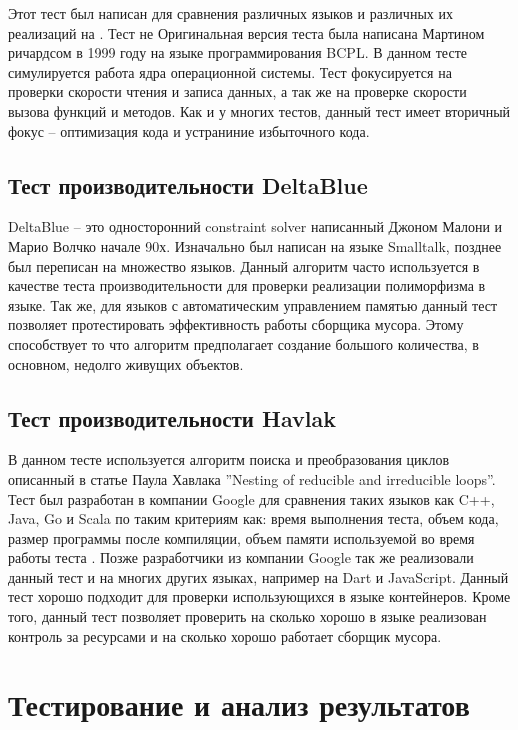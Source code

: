 Этот тест был написан для сравнения различных языков и различных их реализаций на . Тест не
Оригинальная версия теста была написана Мартином ричардсом в 1999 году на языке программирования BCPL. В данном тесте симулируется работа ядра операционной системы.
Тест фокусируется на проверки скорости чтения и записа данных, а так же на проверке скорости вызова функций и методов. Как и у многих тестов, данный тест имеет вторичный фокус -- оптимизация кода и устраниние избыточного кода.
\cite{Richards}

\subsection{Тест производительности DeltaBlue}

DeltaBlue -- это односторонний constraint solver написанный Джоном Малони и Марио Волчко начале 90х. Изначально был написан на языке Smalltalk, позднее был переписан на множество языков. Данный алгоритм часто используется в качестве теста производительности для проверки реализации полиморфизма в языке. Так же, для языков с автоматическим управлением памятью данный тест позволяет протестировать эффективность работы сборщика мусора. Этому способствует то что алгоритм предполагает создание большого количества, в основном, недолго живущих объектов.
\cite{DeltaBlueST, DeltaBlue, DeltaBlue2}

\subsection{Тест производительности Havlak}

В данном тесте используется алгоритм поиска и преобразования циклов описанный в статье Паула Хавлака ”Nesting of reducible and irreducible
loops”. \cite{Havlak} Тест был разработан в компании Google для сравнения таких языков как C++, Java, Go и Scala по таким критериям как: время выполнения теста, объем кода, размер программы после компиляции, объем памяти используемой во время работы теста \cite{HavlakBench}. Позже разработчики из компании Google так же реализовали данный тест и на многих других языках, например на Dart и JavaScript. Данный тест хорошо подходит для проверки использующихся в языке контейнеров. Кроме того, данный тест позволяет проверить на сколько хорошо в языке реализован контроль за ресурсами и на сколько хорошо работает сборщик мусора.

\section{Тестирование и анализ результатов}

